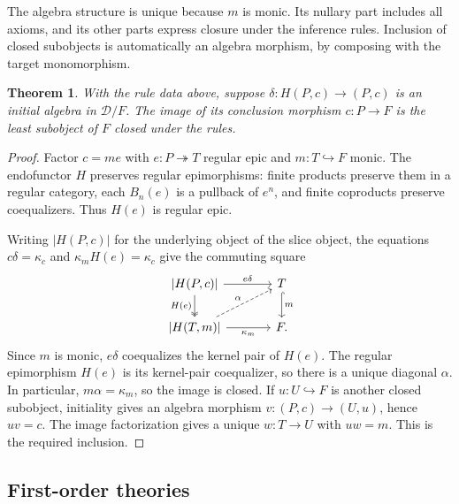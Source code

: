 \documentclass[11pt]{article}
\newtheorem{theorem}{Theorem}[section]
\theoremstyle{definition}\newtheorem{definition}[theorem]{Definition}
\begin{document}
The algebra structure is unique because $m$ is monic. Its nullary
part includes all axioms, and its other parts express closure under
the inference rules. Inclusion of closed subobjects is automatically
an algebra morphism, by composing with the target monomorphism.

\begin{theorem}\label{thm:least-theorem-subobject}
With the rule data above, suppose
$\delta:H(P,c)\to(P,c)$ is an initial algebra in $\mathcal D/F$.
The image of its conclusion morphism $c:P\to F$ is the least
subobject of $F$ closed under the rules.
\end{theorem}
\begin{proof}
Factor $c=me$ with $e:P\twoheadrightarrow T$ regular epic and
$m:T\hookrightarrow F$ monic. The endofunctor $H$ preserves
regular epimorphisms: finite products preserve them in a regular
category, each $B_n(e)$ is a pullback of $e^n$, and finite coproducts
preserve coequalizers. Thus $H(e)$ is regular epic.

Writing $|H(P,c)|$ for the underlying object of the slice object,
the equations $c\delta=\kappa_c$ and
$\kappa_mH(e)=\kappa_c$ give the commuting square
\[
\begin{tikzcd}[column sep=large]
 \lvert H(P,c)\rvert\arrow[r,"e\delta"]\arrow[d,two heads,"H(e)"'] &
 T\arrow[d,hook,"m"]\\
 \lvert H(T,m)\rvert\arrow[r,"\kappa_m"']\arrow[ur,dashed,"\alpha"] & F.
\end{tikzcd}
\]
Since $m$ is monic, $e\delta$ coequalizes the kernel pair of $H(e)$.
The regular epimorphism $H(e)$ is its kernel-pair coequalizer, so
there is a unique diagonal $\alpha$. In particular, $m\alpha=\kappa_m$,
so the image is closed. If $u:U\hookrightarrow F$ is another
closed subobject, initiality gives an algebra morphism
$v:(P,c)\to(U,u)$, hence $uv=c$. The image factorization gives
a unique $w:T\to U$ with $uw=m$. This is the required inclusion.
\end{proof}

\subsection{First-order theories}
\label{app:first-order-derivations}
\end{document}
